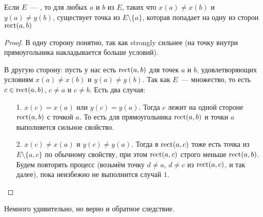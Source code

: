 \begin{lemma} Если $E$~--- \arbs, то для любых $a$ и $b$ из $E$, таких что $x(a) \neq x(b)$ и $y(a) \neq y(b)$, существует точка из $E \setminus \{a \}$, которая попадает на одну из сторон 
$\operatorname{rect}(a, b)$ 
\end{lemma}
\begin{proof} В одну сторону понятно, так как strongly \arbs сильнее (на точку внутри прямоугольника накладывается больше условий). 

В другую сторону: пусть у нас есть $\operatorname{rect}(a, b)$ для точек $a$ и $b$, удовлетворяющих 
условиям $x(a) \neq x(b)$ и $y(a) \neq y(b)$. Так как $E$~--- \arbs множество, то есть
$c \in \operatorname{rect}(a, b)$, $c \neq a$ и $c \neq b$. Есть два случая:
\begin{itemize}
\item[1.] $x(c) = x(a)$ или $y(c) = y(a)$. Тогда $c$ лежит на одной стороне $\operatorname{rect}(a, b)$
с точкой $a$. То есть для прямоугольника $\operatorname{rect}(a, b)$ и точки $a$ выполняется сильное
\arbs свойство.
\item[2.] $x(c) \neq x(a)$ и $y(c) \neq y(a)$. Тогда в $\operatorname{rect}(a, c)$ тоже есть точка из $E \setminus \{a, c \}$ по обычному \arbs свойству, при этом $\operatorname{rect}(a, c)$ строго меньше
$\operatorname{rect}(a, b)$. Будем повторять процесс (возьмём точку $d \neq a$, $d \neq c$ из $\operatorname{rect}(a, c)$,
и так далее), пока неизбежно не выполнится случай $1$.
\end{itemize}
\end{proof}

Немного удивительно, но верно и обратное следствие.


